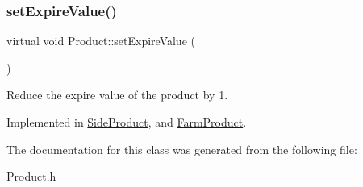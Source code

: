 \mbox{\label{classProduct_a84aba139efc9cbcb05d47de168645463}} 
\subsubsection{\texorpdfstring{set\+Expire\+Value()}{setExpireValue()}}
{\footnotesize\ttfamily virtual void Product\+::set\+Expire\+Value (\begin{DoxyParamCaption}{ }\end{DoxyParamCaption})\hspace{0.3cm}{\ttfamily [pure virtual]}}

Reduce the expire value of the product by 1. 

Implemented in \hyperlink{classSideProduct_abff90c90ea13a3511dcd8dbdf55fc33c}{Side\+Product}, and \hyperlink{classFarmProduct_aea484f8f23984c14e0014fa7c35b9629}{Farm\+Product}.



The documentation for this class was generated from the following file\+:\begin{DoxyCompactItemize}
\item 
Product.\+h\end{DoxyCompactItemize}
